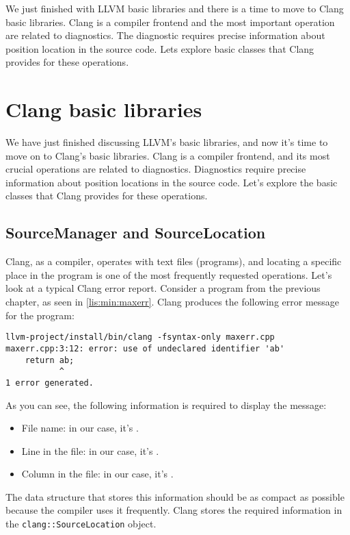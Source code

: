 We just finished with LLVM basic libraries and there is a time to move to Clang
basic libraries. Clang is a compiler frontend and the most important operation
are related to diagnostics. The diagnostic requires precise information about
position location in the source code. Lets explore basic classes that Clang
provides for these operations. 

\section{Clang basic libraries}

We have just finished discussing LLVM's basic libraries, and now it's time to
move on to Clang's basic libraries. Clang is a compiler frontend, and its most
crucial operations are related to diagnostics. Diagnostics require precise
information about position locations in the source code. Let's explore the basic
classes that Clang provides for these operations.

\subsection{SourceManager and SourceLocation}
Clang, as a compiler, operates with text files (programs), and locating a
specific place in the program is one of the most frequently requested
operations. Let's look at a typical Clang error report. Consider a program from
the previous chapter, as seen in \cref{lis:min:maxerr}. Clang produces the
following error message for the program: 
\begin{adjustwidth}{0em}{0em}
\begin{verbatim}
llvm-project/install/bin/clang -fsyntax-only maxerr.cpp
maxerr.cpp:3:12: error: use of undeclared identifier 'ab'
    return ab;
           ^
1 error generated.
\end{verbatim}
\end{adjustwidth}
As you can see, the following information is required to display the message:
\begin{itemize}
\item File name: in our case, it's .
\item Line in the file: in our case, it's .
\item Column in the file: in our case, it's .
\end{itemize}
The data structure that stores this information should be as compact as possible
because the compiler uses it frequently. Clang stores the required information
in the \texttt{clang::SourceLocation} object. 

